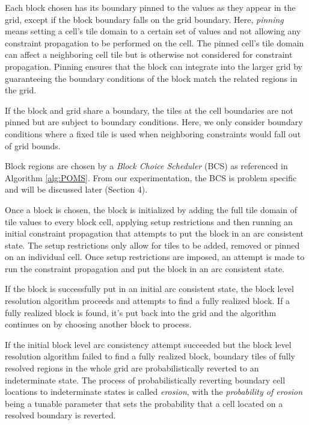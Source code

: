 Each block chosen has its boundary pinned to the values as they appear in the grid,
except if the block boundary falls on the grid boundary.
Here, \textit{pinning} means setting a cell's tile domain to a certain set of values
and not allowing any constraint propagation to be performed on the cell.
The pinned cell's tile domain can affect a neighboring cell tile but is otherwise not
considered for constraint propagation.
Pinning ensures that the block can integrate into the larger grid by guaranteeing
the boundary conditions of the block match the related regions in the grid.

If the block and grid share a boundary, the tiles at the cell boundaries are not
pinned but are subject to boundary conditions.
Here, we only consider boundary conditions where a fixed tile is used when neighboring
constraints would fall out of grid bounds.

Block regions are chosen by a \textit{Block Choice Scheduler} (BCS) as referenced in Algorithm \ref{alg:POMS}.
From our experimentation, the BCS is problem specific and will be discussed later (Section 4).

Once a block is chosen, the block is initialized by adding the full tile domain of tile values
to every block cell, applying setup restrictions and then running an initial constraint propagation
that attempts to put the block in an arc consistent state.
The setup restrictions only allow for tiles to be added, removed
or pinned on an individual cell.
Once setup restrictions are imposed, an attempt is made to run the constraint propagation and
put the block in an arc consistent state.

If the block is successfully put in an initial arc consistent state, the block level resolution algorithm proceeds and attempts to find a fully realized block.
If a fully realized block is found, it's put back into the grid and the algorithm
continues on by choosing another block to process.

If the initial block level arc consistency attempt succeeded but the block level resolution
algorithm failed to find a fully realized block,
boundary tiles of fully resolved regions in the whole grid are probabilistically reverted to an indeterminate state.
The process of probabilistically reverting boundary cell locations to indeterminate states is called \textit{erosion},
with the \textit{probability of erosion} being a tunable parameter that sets the probability that a cell located on a resolved boundary
is reverted.


